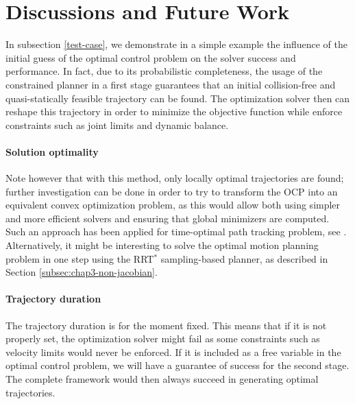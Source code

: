 \section{Discussions and Future Work}
\label{discussion}

In subsection \ref{test-case}, we demonstrate in a simple example the
influence of the initial guess of the optimal control problem on the
solver success and performance. In fact, due to its probabilistic
completeness, the usage of the constrained planner in a first stage
guarantees that an initial collision-free and quasi-statically
feasible trajectory can be found. The optimization solver then can
reshape this trajectory in order to minimize the objective function
while enforce constraints such as joint limits and dynamic
balance.

\paragraph{Solution optimality}
Note however that with this method, only locally optimal trajectories
are found; further investigation can be done in order to try to
transform the OCP into an equivalent convex optimization problem, as
this would allow both using simpler and more efficient solvers and
ensuring that global minimizers are computed. Such an approach has
been applied for time-optimal path tracking problem, see
\cite{verscheure2009time}. Alternatively, it might be interesting to
solve the optimal motion planning problem in one step using the
RRT$^*$ sampling-based planner, as described in Section
\ref{subsec:chap3-non-jacobian}.

\paragraph{Trajectory duration}
The trajectory duration is for the moment fixed. This means that if it
is not properly set, the optimization solver might fail as some
constraints such as velocity limits would never be enforced. If it is
included as a free variable in the optimal control problem, we will
have a guarantee of success for the second stage. The complete
framework would then always succeed in generating optimal
trajectories.

